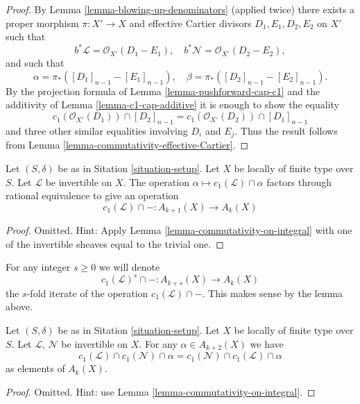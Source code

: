 \begin{proof}
By Lemma \ref{lemma-blowing-up-denominators} (applied twice)
there exists a proper morphism
$\pi : X' \to X$ and effective Cartier divisors
$D_1, E_1, D_2, E_2$ on $X'$ such that
$$
b^*\mathcal{L} = \mathcal{O}_{X'}(D_1 - E_1),
\quad
b^*\mathcal{N} = \mathcal{O}_{X'}(D_2 - E_2),
$$
and such that
$$
\alpha = \pi_*([D_1]_{n - 1} - [E_1]_{n - 1}),
\quad
\beta = \pi_*([D_2]_{n - 1} - [E_2]_{n - 1}).
$$
By the projection formula of Lemma \ref{lemma-pushforward-cap-c1}
and the additivity of Lemma \ref{lemma-c1-cap-additive}
it is enough to show the equality
$$
c_1(\mathcal{O}_{X'}(D_1)) \cap [D_2]_{n - 1}
=
c_1(\mathcal{O}_{X'}(D_2)) \cap [D_1]_{n - 1}
$$
and three other similar equalities involving $D_i$ and $E_j$.
Thus the result follows from Lemma \ref{lemma-commutativity-effective-Cartier}.
\end{proof}

\begin{lemma}
\label{lemma-factors}
Let $(S, \delta)$ be as in Sitation \ref{situation-setup}.
Let $X$ be locally of finite type over $S$.
Let $\mathcal{L}$ be invertible on $X$.
The operation $\alpha \mapsto c_1(\mathcal{L}) \cap \alpha$
factors through rational equivalence to give an operation
$$
c_1(\mathcal{L}) \cap - : A_{k + 1}(X) \to A_k(X)
$$
\end{lemma}

\begin{proof}
Omitted. Hint:
Apply Lemma \ref{lemma-commutativity-on-integral}
with one of the invertible sheaves equal to the
trivial one.
\end{proof}

\noindent
For any integer $s \geq 0$ we will denote
$$
c_1(\mathcal{L})^s \cap - : A_{k + s}(X) \to A_k(X)
$$
the $s$-fold iterate of the operation $c_1(\mathcal{L}) \cap - $.
This makes sense by the lemma above.

\begin{lemma}
\label{lemma-cap-commutative}
Let $(S, \delta)$ be as in Sitation \ref{situation-setup}.
Let $X$ be locally of finite type over $S$.
Let $\mathcal{L}$, $\mathcal{N}$ be invertible on $X$.
For any $\alpha \in A_{k + 2}(X)$ we have
$$
c_1(\mathcal{L}) \cap c_1(\mathcal{N}) \cap \alpha
=
c_1(\mathcal{N}) \cap c_1(\mathcal{L}) \cap \alpha
$$
as elements of $A_k(X)$.
\end{lemma}

\begin{proof}
Omitted. Hint: use Lemma \ref{lemma-commutativity-on-integral}.
\end{proof}

